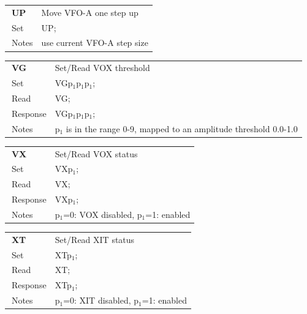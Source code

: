 \documentclass[12pt]{book}
\begin{document}
\begin{center}
\begin{tabular}{|p{2cm}|p{11cm}|}
\toprule
$\phantom{\Big|}$\textbf{\large UP} & Move VFO-A one step up \\\cline{1-2}
$\phantom{\Big|}${\large Set} & {UP;} \\\hline
$\phantom{\Big|}${\large Notes} & \multicolumn{1}{|p{11cm}|}{use current VFO-A step size} \\
\bottomrule
\end{tabular}
\end{center}

\begin{center}
\begin{tabular}{|p{2cm}|p{11cm}|}
\toprule
$\phantom{\Big|}$\textbf{\large VG} & Set/Read VOX threshold \\\cline{1-2}
$\phantom{\Big|}${\large Set} & {VGp$_1$p$_1$p$_1$;} \\\hline
$\phantom{\Big|}${\large Read} & {VG;} \\\hline
$\phantom{\Big|}${\large Response} & {VGp$_1$p$_1$p$_1$;} \\\hline
$\phantom{\Big|}${\large Notes} & \multicolumn{1}{|p{11cm}|}{p$_1$ is in the range 0-9, mapped to an amplitude threshold 0.0-1.0} \\
\bottomrule
\end{tabular}
\end{center}

\begin{center}
\begin{tabular}{|p{2cm}|p{11cm}|}
\toprule
$\phantom{\Big|}$\textbf{\large VX} & Set/Read VOX status \\\cline{1-2}
$\phantom{\Big|}${\large Set} & {VXp$_1$;} \\\hline
$\phantom{\Big|}${\large Read} & {VX;} \\\hline
$\phantom{\Big|}${\large Response} & {VXp$_1$;} \\\hline
$\phantom{\Big|}${\large Notes} & \multicolumn{1}{|p{11cm}|}{p$_1$=0: VOX disabled, p$_1$=1: enabled} \\
\bottomrule
\end{tabular}
\end{center}

\begin{center}
\begin{tabular}{|p{2cm}|p{11cm}|}
\toprule
$\phantom{\Big|}$\textbf{\large XT} & Set/Read XIT status \\\cline{1-2}
$\phantom{\Big|}${\large Set} & {XTp$_1$;} \\\hline
$\phantom{\Big|}${\large Read} & {XT;} \\\hline
$\phantom{\Big|}${\large Response} & {XTp$_1$;} \\\hline
$\phantom{\Big|}${\large Notes} & \multicolumn{1}{|p{11cm}|}{p$_1$=0: XIT disabled, p$_1$=1: enabled} \\
\bottomrule
\end{tabular}
\end{center}
\end{document}

